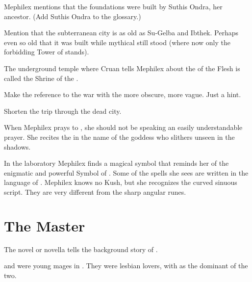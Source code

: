 \begin{changes}
    Mephilex mentions that the foundations were built by Suthis Ondra, her ancestor.
    (Add Suthis Ondra to the glossary.)
  
    Mention that the subterranean city is as old as Su-Gelba and Ibthek.
    Perhaps even so old that it was built while mythical \Aamon still stood (where now only the forbidding Tower of \Aamon stands).
    
    The underground temple where Cruan tells Mephilex about the \Arcanum of the Flesh is called the Shrine of the .
    
    Make the reference to the war with the \banes more obscure, more vague.
    Just a hint. 
    
    Shorten the trip through the dead city. 
    
    When Mephilex prays to \Nasshikerr, she should not be speaking an easily understandable prayer.
    She recites the  in the name of the goddess \Nasshikerr who slithers unseen in the shadows.
    
    In the laboratory Mephilex finds a magical symbol that reminds her of the enigmatic and powerful Symbol of \Aamon.
    Some of the spells she sees are written in the language of .
    Mephilex knows no Kush, but she recognizes the curved sinuous script. 
    They are very different from the sharp angular \Draconic runes.
\end{changes}
























\chapter{The Master}
The novel or novella tells the background story of .

\MoroCobrel and \TulionSperra were young mages in . 
They were lesbian lovers, with \Sperra as the dominant of the two. 















